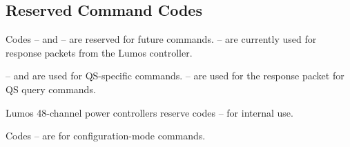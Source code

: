 \documentclass[letterpaper,twoside,onecolumn,openright,final]{memoir}
\begin{document}
\subsection{Reserved Command Codes}
Codes -- and -- are reserved for future commands.  -- are currently used
for response packets from the Lumos controller.
\begin{QS*}
	-- and  are used for QS-specific commands.
	-- are used for the response packet for QS query commands.
\end{QS*}

Lumos 48-channel power controllers reserve codes -- for internal use.

Codes -- are for configuration-mode commands.
\newpage
\begin{QS}

\end{QS}
\end{document}
